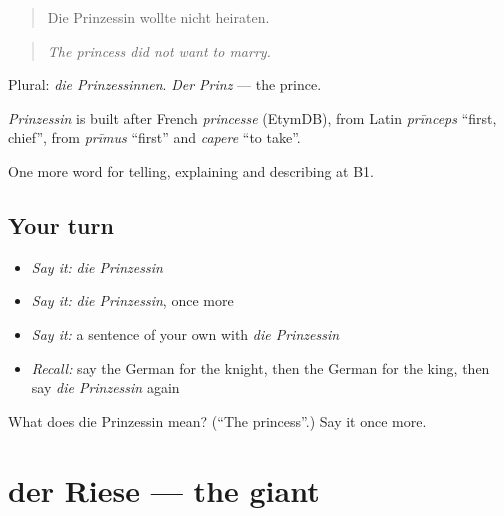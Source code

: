 \begin{quote}
Die Prinzessin wollte nicht heiraten.
\end{quote}

\begin{quote}
\emph{The princess did not want to marry.}
\end{quote}

Plural: \emph{die Prinzessinnen}. \emph{Der Prinz} — the prince.

\begin{cousinweb}
\emph{Prinzessin} is built after French \emph{princesse} (EtymDB), from Latin \emph{prīnceps} \textquotedblleft{}first, chief\textquotedblright{}, from \emph{prīmus} \textquotedblleft{}first\textquotedblright{} and \emph{capere} \textquotedblleft{}to take\textquotedblright{}.
\end{cousinweb}

\begin{grammarlens}[title={What you've built}]
One more word for telling, explaining and describing at B1.
\end{grammarlens}

\subsection*{Your turn}
\begin{itemize}
\raggedright
  \item \emph{Say it:} \emph{die Prinzessin}
  \item \emph{Say it:} \emph{die Prinzessin}, once more
  \item \emph{Say it:} a sentence of your own with \emph{die Prinzessin}
  \item \emph{Recall:} say the German for the knight, then the German for the king, then say \emph{die Prinzessin} again
\end{itemize}

\begin{tcolorbox}[breakable,colback=teal!4,colframe=teal!35!black,title={Before you move on}]
What does die Prinzessin mean? (\textquotedblleft{}The princess\textquotedblright{}.) Say it once more.
\end{tcolorbox}
\section[der Riese]{der Riese — the giant}

\label{lesson:GE-C315-riese}



